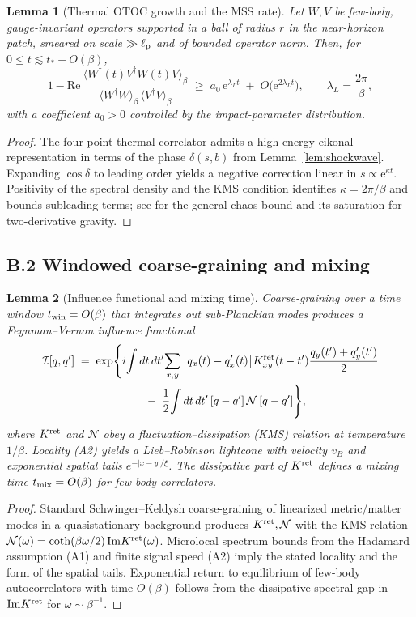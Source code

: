 \documentclass[a4paper,11pt]{article}
\theoremstyle{plain}
\newtheorem{lemma}{Lemma}
\theoremstyle{definition}
\theoremstyle{remark}
\begin{document}
\begin{lemma}[Thermal OTOC growth and the MSS rate]
\label{lem:otoc-growth}
Let $W,V$ be few-body, gauge-invariant operators supported in a ball of radius $r$ in the near-horizon patch, smeared on scale $\gg \ell_{\rm p}$ and of bounded operator norm.
Then, for $0\le t \lesssim t_\ast-O(\beta)$,
\[
1-\mathrm{Re}\,\frac{\langle W^\dagger(t)V^\dagger W(t)V\rangle_\beta}{\langle W^\dagger W\rangle_\beta\,\langle V^\dagger V\rangle_\beta}
\;\ge\; a_0\,\mathrm{e}^{\lambda_L t}\;+\;O\!\big(\mathrm{e}^{2\lambda_L t}\big),
\qquad \lambda_L=\frac{2\pi}{\beta},
\]
with a coefficient $a_0>0$ controlled by the impact-parameter distribution.
\end{lemma}
\begin{proof}
The four-point thermal correlator admits a high-energy eikonal representation in terms of the phase $\delta(s,b)$ from Lemma~\ref{lem:shockwave}.
Expanding $\cos\delta$ to leading order yields a negative correction linear in $s\propto \mathrm{e}^{\kappa t}$.
Positivity of the spectral density and the KMS condition identifies $\kappa=2\pi/\beta$ and bounds subleading terms; see \citep{Maldacena:2016} for the general chaos bound and its saturation for two-derivative gravity.
\end{proof}

\subsection*{B.2 Windowed coarse-graining and mixing}
\begin{lemma}[Influence functional and mixing time]
\label{lem:IF}
Coarse-graining over a time window $t_{\rm win}=O(\beta)$ that integrates out sub-Planckian modes produces a Feynman--Vernon influence functional
\[
\begin{aligned}
\mathcal{I}[q,q'] \;=\; \exp\!\Bigg\{&
 i\!\int dt\,dt'\!\sum_{x,y}\big[q_x(t)-q'_x(t)\big]K^{\rm ret}_{xy}(t-t')
 \frac{q_y(t')+q'_y(t')}{2} \\
 &\qquad
 -\;\frac{1}{2}\!\int dt\,dt'\,[q-q']\,\mathcal{N}\,[q-q']
\Bigg\},
\end{aligned}
\]
where $K^{\rm ret}$ and $\mathcal{N}$ obey a fluctuation--dissipation (KMS) relation at temperature $1/\beta$.
Locality (A2) yields a Lieb--Robinson lightcone with velocity $v_B$ and exponential spatial tails $e^{-|x-y|/\xi}$.
The dissipative part of $K^{\rm ret}$ defines a mixing time $t_{\rm mix}=O(\beta)$ for few-body correlators.
\end{lemma}
\begin{proof}
Standard Schwinger--Keldysh coarse-graining of linearized metric/matter modes in a quasistationary background produces $K^{\rm ret},\mathcal{N}$ with the KMS relation $\mathcal{N}(\omega)=\coth(\beta\omega/2)\,\mathrm{Im}K^{\rm ret}(\omega)$.
Microlocal spectrum bounds from the Hadamard assumption (A1) and finite signal speed (A2) imply the stated locality and the form of the spatial tails.
Exponential return to equilibrium of few-body autocorrelators with time $O(\beta)$ follows from the dissipative spectral gap in $\mathrm{Im}K^{\rm ret}$ for $\omega\sim \beta^{-1}$.
\end{proof}
\end{document}
